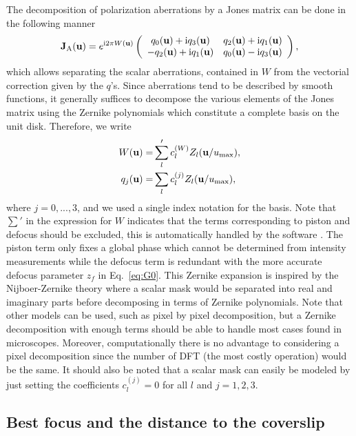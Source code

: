 \documentclass[reprint,aps,pra,superscriptaddress,
amsmath,amssymb]{revtex4-1}
\begin{document}
The decomposition of polarization aberrations by a Jones matrix can be 
done in the following manner
\begin{align} \label{eq:jqw}
  \textbf J_\text{A}(\textbf u) = e^{\text{i} 2\pi W(\textbf u)} \left(
\begin{array}{cc}
q_0(\textbf u) + \text{i} q_3(\textbf u) &q_2(\textbf u) + \text{i} q_1(\textbf u) \\
-q_2(\textbf u) + \text{i} q_1(\textbf u) & q_0(\textbf u) - \text{i} q_3(\textbf u)
\end{array}
\right),
\end{align}
which allows separating the scalar aberrations, contained 
in $W$ from the vectorial correction given by the $q$'s. 
Since aberrations tend to be described by smooth functions, it generally 
suffices to decompose the various elements of the Jones matrix using the 
Zernike polynomials which constitute a complete basis on the unit disk.
Therefore, we write
\begin{align}
  W (\textbf u) = &\sum'_l c_{l}^{(W)} Z_l(\textbf u/u_\text{max}) ,\\
  q_{j} (\textbf u) = &\sum_l c_{l}^{(j)} Z_l(\textbf u/u_\text{max}),
\end{align}
where $j=0,...,3$, and we used a single index notation for the basis. 
Note that $\sum'$ in the expression for $W$ indicates that the terms 
corresponding to piston and defocus should be excluded, this is 
automatically handled by the software \cite{}. The piston term only 
fixes a global phase which cannot be determined from intensity measurements
while the defocus term is redundant with the more accurate defocus parameter
$z_f$ in Eq.~\ref{eq:G0}.
This Zernike expansion is inspired by the Nijboer-Zernike theory 
\cite{janssen2002extended,braat2003extended,braat2005extended} where a 
scalar mask would be separated into real and imaginary parts before 
decomposing in terms of Zernike polynomials. 
Note that other models can be used, such as 
pixel by pixel decomposition, but a Zernike decomposition with enough 
terms should be able to handle most cases found in microscopes. Moreover, 
computationally there is no advantage to considering a pixel decomposition 
since the number of DFT (the most costly operation) would be the same.
It should also  be noted that a scalar mask can easily be modeled by just
setting the coefficients $c^{(j)}_l=0$ for all $l$ and $j=1,2,3$.


\subsection{Best focus and the distance to the coverslip}
\end{document}
